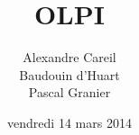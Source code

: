 


\newcommand*\titre{OLPI}
\title{\titre}
\author{Alexandre Careil\\
Baudouin d'Huart\\
Pascal Granier\\
}
\date{vendredi 14 mars 2014}







\newpage
\tableofcontents










\label{lastPage} %

